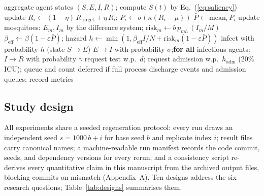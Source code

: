 \documentclass[]{interact}
\begin{document}
\begin{algorithm}[htb]
\caption{Daily simulation step of the hybrid model}
\label{alg:daily}
\begin{algorithmic}[1]
\State aggregate agent states $(S,E,I,R)$; compute $S(t)$ by Eq.~(\ref{eq:saliency})
 
  \State update $R_i \leftarrow (1-\eta)\,R_{\mathrm{target}} + \eta\,R_i$; $P_i \leftarrow \sigma(\kappa(R_i - \mu))$
\EndFor
\State $\bar{P} \leftarrow \mathrm{mean}_i\, P_i$ 
\State update mosquitoes: $E_m, I_m$ by the difference system; $\mathrm{risk}_m \leftarrow b\,p_{mh}\,(I_m/M)$
\State $\beta_{\mathrm{eff}} \leftarrow \beta(1-\varepsilon \bar{P})$; hazard $h \leftarrow \min(1, \beta_{\mathrm{eff}} I/N + \mathrm{risk}_m (1-\varepsilon\bar{P}))$
 
  \State infect with probability $h$ (state $S \to E$)
\EndFor
{} $E \to I$ with probability $\sigma$;\quad \textbf{for all} infectious agents: $I \to R$ with probability $\gamma$
\EndFor
{} 
  \State request test w.p.\ $d$; request admission w.p.\ $h_{\mathrm{adm}}$ (20\% ICU); queue and count deferred if full
\EndFor
\State process discharge events and admission queues; record metrics
\end{algorithmic}
\end{algorithm}

\subsection{Study design}

All experiments share a seeded regeneration protocol: every run draws an independent seed $s = 1000\,b + i$ for base seed $b$ and replicate index $i$; result files carry canonical names; a machine-readable run manifest records the code commit, seeds, and dependency versions for every rerun; and a consistency script re-derives every quantitative claim in this manuscript from the archived output files, blocking commits on mismatch (Appendix~A). Ten designs address the six research questions; Table~\ref{tab:designs} summarises them.
\end{document}
